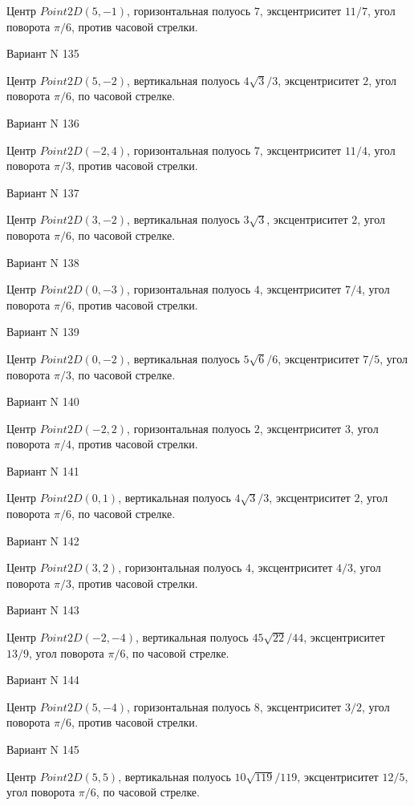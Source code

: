 \documentclass[11pt]{report}
\begin{document}
Центр $Point2D\left(5, -1\right)$, горизонтальная полуось $7$, эксцентриситет $11 / 7$, угол поворота $\pi / 6$, против часовой стрелки.

Вариант N 135

Центр $Point2D\left(5, -2\right)$, вертикальная полуось $4 \sqrt{3} / 3$, эксцентриситет $2$, угол поворота $\pi / 6$, по часовой стрелке.

Вариант N 136

Центр $Point2D\left(-2, 4\right)$, горизонтальная полуось $7$, эксцентриситет $11 / 4$, угол поворота $\pi / 3$, против часовой стрелки.

Вариант N 137

Центр $Point2D\left(3, -2\right)$, вертикальная полуось $3 \sqrt{3}$, эксцентриситет $2$, угол поворота $\pi / 6$, по часовой стрелке.

Вариант N 138

Центр $Point2D\left(0, -3\right)$, горизонтальная полуось $4$, эксцентриситет $7 / 4$, угол поворота $\pi / 6$, против часовой стрелки.

Вариант N 139

Центр $Point2D\left(0, -2\right)$, вертикальная полуось $5 \sqrt{6} / 6$, эксцентриситет $7 / 5$, угол поворота $\pi / 3$, по часовой стрелке.

Вариант N 140

Центр $Point2D\left(-2, 2\right)$, горизонтальная полуось $2$, эксцентриситет $3$, угол поворота $\pi / 4$, против часовой стрелки.

Вариант N 141

Центр $Point2D\left(0, 1\right)$, вертикальная полуось $4 \sqrt{3} / 3$, эксцентриситет $2$, угол поворота $\pi / 6$, по часовой стрелке.

Вариант N 142

Центр $Point2D\left(3, 2\right)$, горизонтальная полуось $4$, эксцентриситет $4 / 3$, угол поворота $\pi / 3$, против часовой стрелки.

Вариант N 143

Центр $Point2D\left(-2, -4\right)$, вертикальная полуось $45 \sqrt{22} / 44$, эксцентриситет $13 / 9$, угол поворота $\pi / 6$, по часовой стрелке.

Вариант N 144

Центр $Point2D\left(5, -4\right)$, горизонтальная полуось $8$, эксцентриситет $3 / 2$, угол поворота $\pi / 6$, против часовой стрелки.

Вариант N 145

Центр $Point2D\left(5, 5\right)$, вертикальная полуось $10 \sqrt{119} / 119$, эксцентриситет $12 / 5$, угол поворота $\pi / 6$, по часовой стрелке.
\end{document}
